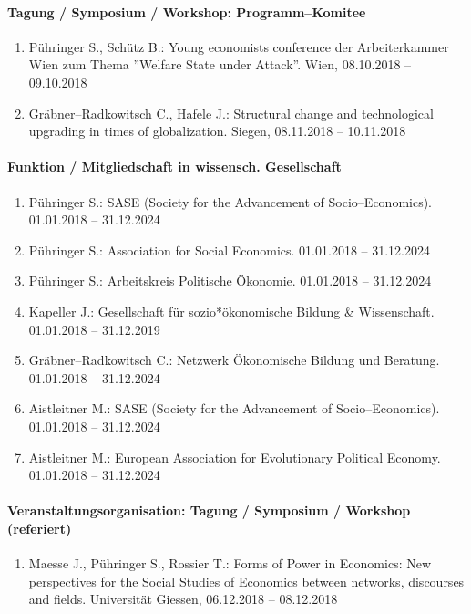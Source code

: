 \paragraph{Tagung / Symposium / Workshop: Programm--Komitee}
\begin{enumerate}[leftmargin=*, labelsep=0.5cm]
\item Pühringer S., Schütz B.: Young economists conference der Arbeiterkammer Wien zum Thema ''Welfare State under Attack''. Wien, 08.10.2018 -- 09.10.2018
\item Gräbner--Radkowitsch C., Hafele J.: Structural change and technological upgrading in times of globalization. Siegen, 08.11.2018 -- 10.11.2018
\end{enumerate}
\paragraph{Funktion / Mitgliedschaft in wissensch. Gesellschaft}
\begin{enumerate}[leftmargin=*, labelsep=0.5cm]
\item Pühringer S.: SASE (Society for the Advancement of Socio--Economics). 01.01.2018 -- 31.12.2024
\item Pühringer S.: Association for Social Economics. 01.01.2018 -- 31.12.2024
\item Pühringer S.: Arbeitskreis Politische Ökonomie. 01.01.2018 -- 31.12.2024
\item Kapeller J.: Gesellschaft für sozio*ökonomische Bildung \& Wissenschaft. 01.01.2018 -- 31.12.2019
\item Gräbner--Radkowitsch C.: Netzwerk Ökonomische Bildung und Beratung. 01.01.2018 -- 31.12.2024
\item Aistleitner M.: SASE (Society for the Advancement of Socio--Economics). 01.01.2018 -- 31.12.2024
\item Aistleitner M.: European Association for Evolutionary Political Economy. 01.01.2018 -- 31.12.2024
\end{enumerate}
\paragraph{Veranstaltungsorganisation: Tagung / Symposium / Workshop (referiert)}
\begin{enumerate}[leftmargin=*, labelsep=0.5cm]
\item Maesse J., Pühringer S., Rossier T.: Forms of Power in Economics: New perspectives for the Social Studies of Economics between networks, discourses and fields. Universität Giessen, 06.12.2018 -- 08.12.2018
\end{enumerate}
